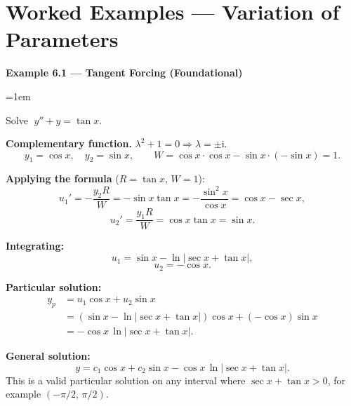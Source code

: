 \documentclass[12pt,a4paper]{article}
\newenvironment{example}[1]{%
  \vspace{0.8em}
  \noindent{\footnotesize\scshape\color{orange!50!black} Example}\par
  \noindent\textbf{#1}\par\vspace{0.3em}
  \begin{list}{}{\leftmargin=1em\rightmargin=0pt}\item
}{%
  \end{list}\vspace{0.8em}
}
\newcommand{\ii}{\mathrm{i}}
\begin{document}
\section{Worked Examples --- Variation of Parameters}

\begin{example}{Example 6.1 --- Tangent Forcing (Foundational)}
Solve $\;y'' + y = \tan x$.

\medskip
\textbf{Complementary function.} $\lambda^2+1=0 \Rightarrow \lambda=\pm\ii$.
\[
  y_1 = \cos x, \quad y_2 = \sin x, \qquad
  W = \cos x\cdot\cos x - \sin x\cdot(-\sin x) = 1.
\]

\textbf{Applying the formula} ($R = \tan x$, $W = 1$):
\[
  u_1' = -\frac{y_2 R}{W} = -\sin x\tan x = -\frac{\sin^2 x}{\cos x}
       = \cos x - \sec x,
\]
\[
  u_2' = \frac{y_1 R}{W} = \cos x\tan x = \sin x.
\]

\textbf{Integrating:}
\[
  u_1 = \sin x - \ln|\sec x + \tan x|,
\]
\[
  u_2 = -\cos x.
\]

\textbf{Particular solution:}
\begin{align*}
  y_p &= u_1\cos x + u_2\sin x\\
      &= (\sin x - \ln|\sec x+\tan x|)\cos x + (-\cos x)\sin x\\
      &= -\cos x\,\ln|\sec x + \tan x|.
\end{align*}

\textbf{General solution:}
\[
  \boxed{y = c_1\cos x + c_2\sin x - \cos x\,\ln|\sec x + \tan x|.}
\]
This is a valid particular solution on any interval where $\sec x + \tan x > 0$,
for example $(-\pi/2,\,\pi/2)$.
\end{example}

\end{document}
